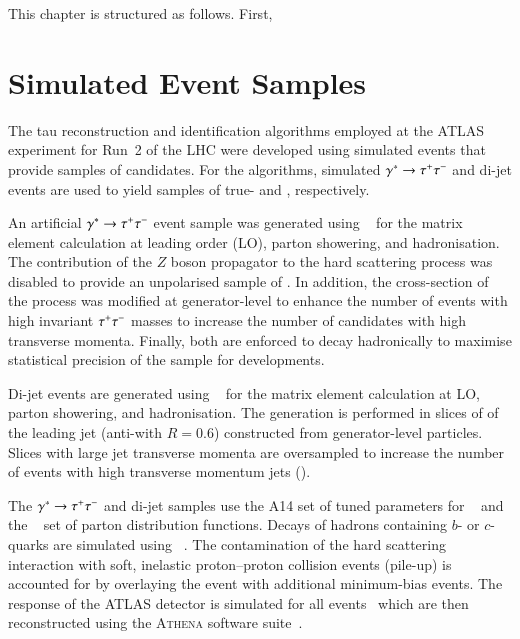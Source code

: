 This chapter is structured as follows. First,






\section{Simulated Event Samples}%
\label{sec:tauid_mc}

The tau reconstruction and identification algorithms employed at the
ATLAS experiment for Run~2 of the LHC were developed using simulated
events that provide samples of \tauhadvis candidates. For the \tauid
algorithms, simulated $\gamma^{*} \to \tau^{+} \tau^{-}$ and di-jet events are
used to yield samples of true- and \faketauhadvis, respectively.

An artificial $\gamma^{*} \to \tau^{+} \tau^{-}$ event sample was generated
using \PYTHIA[8.212]~\cite{Sjostrand:2014zea} for the matrix element
calculation at leading order (LO), parton showering, and
hadronisation. The contribution of the $Z$ boson propagator to the
hard scattering process was disabled to provide an unpolarised sample
of \tauleptons. In addition, the cross-section of the process was
modified at generator-level to enhance the number of events with high
invariant $\tau^{+} \tau^{-}$ masses to increase the number of \tauhadvis
candidates with high transverse momenta. Finally, both \tauleptons are
enforced to decay hadronically to maximise statistical precision of
the \truetauhadvis sample for \tauid developments.

Di-jet events are generated using
\PYTHIA[8.186]~\cite{Sjostrand:2014zea} for the matrix element
calculation at LO, parton showering, and hadronisation. The generation
is performed in slices of \pT of the leading jet (anti-\kt with
$R = 0.6$) constructed from generator-level particles. Slices with
large jet transverse momenta are oversampled to increase the number of
events with high transverse momentum jets (\faketauhadvis).

The $\gamma^{*} \to \tau^{+} \tau^{-}$ and di-jet samples use the A14 set of
tuned parameters for \PYTHIA[8]~\cite{ATL-PHYS-PUB-2014-021} and the
\NNPDF[2.3lo]~\cite{Ball:2012cx} set of parton distribution functions.
Decays of hadrons containing $b$- or $c$-quarks are simulated using
\EVTGEN[v1.2.0]~\cite{Lange:2001uf}. The contamination of the hard
scattering interaction with soft, inelastic proton--proton collision
events (pile-up) is accounted for by overlaying the event with
additional minimum-bias events. The response of the ATLAS detector is
simulated for all events~\cite{SOFT-2010-01} which are then
reconstructed using the \textsc{Athena} software
suite~\cite{ATL-SOFT-PUB-2021-001}.


